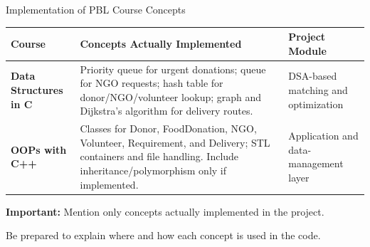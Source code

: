 \documentclass[aspectratio=169,11pt]{beamer}
\newcommand{\smallnote}[1]{%
\vspace{0.08cm}
{\scriptsize\color{GEUGrey}#1}
}
\begin{document}
\begin{frame}{Implementation of PBL Course Concepts}

\scriptsize
\renewcommand{\arraystretch}{1.3}
\setlength{\tabcolsep}{5pt}

\begin{tabularx}{\textwidth}
{@{}>{\raggedright\arraybackslash\bfseries}p{2.25cm}
>{\raggedright\arraybackslash}X
>{\raggedright\arraybackslash}p{2.35cm}@{}}
\toprule
Course & Concepts Actually Implemented & Project Module\\
\midrule
Data Structures in C &
Priority queue for urgent donations; queue for NGO requests; hash table for donor/NGO/volunteer lookup; graph and Dijkstra's algorithm for delivery routes. &
DSA-based matching and optimization\\
\addlinespace[3pt]
OOPs with C++ &
Classes for Donor, FoodDonation, NGO, Volunteer, Requirement, and Delivery; STL containers and file handling. Include inheritance/polymorphism only if implemented. &
Application and data-management layer\\
\bottomrule
\end{tabularx}

\vfill
\begin{center}
\colorbox{GEULightBlue}{
\parbox{.92\textwidth}{
\centering
\textbf{Important:} Mention only concepts actually implemented in the project.
}}
\end{center}

\smallnote{Be prepared to explain where and how each concept is used in the code.}

\end{frame}
\end{document}
